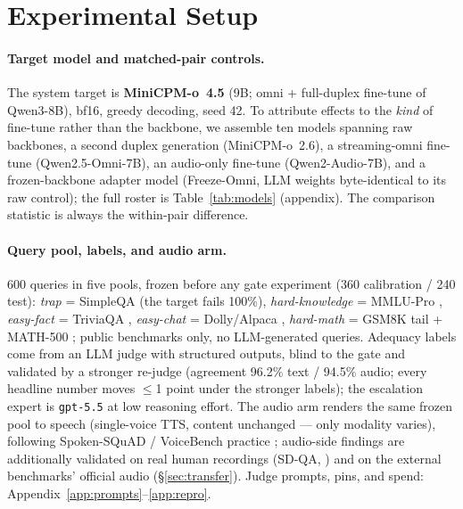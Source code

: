 \section{Experimental Setup}
\label{sec:setup}

\paragraph{Target model and matched-pair controls.}
The system target is \textbf{MiniCPM-o~4.5} (9B; omni + full-duplex
fine-tune of Qwen3-8B), bf16, greedy decoding, seed 42. To attribute
effects to the \emph{kind} of fine-tune rather than the backbone, we
assemble ten models spanning raw backbones, a second duplex generation
(MiniCPM-o~2.6), a streaming-omni fine-tune (Qwen2.5-Omni-7B), an
audio-only fine-tune (Qwen2-Audio-7B), and a frozen-backbone adapter
model (Freeze-Omni, LLM weights byte-identical to its raw control);
the full roster is Table~\ref{tab:models} (appendix). The comparison
statistic is always the within-pair difference.

\paragraph{Query pool, labels, and audio arm.}
600 queries in five pools, frozen before any gate experiment (360
calibration / 240 test): \emph{trap} = SimpleQA \citep{wei2024simpleqa}
(the target fails 100\%), \emph{hard-knowledge} = MMLU-Pro
\citep{wang2024mmlupro}, \emph{easy-fact} = TriviaQA
\citep{joshi2017triviaqa}, \emph{easy-chat} = Dolly/Alpaca
\citep{conover2023dolly,taori2023alpaca}, \emph{hard-math} = GSM8K tail
+ MATH-500 \citep{cobbe2021gsm8k,hendrycks2021math,lightman2024lets};
public benchmarks only, no LLM-generated queries. Adequacy labels come
from an LLM judge \citep{zheng2023judging} with structured outputs,
blind to the gate and validated by a stronger re-judge (agreement 96.2\%
text / 94.5\% audio; every headline number moves $\le$1 point under the
stronger labels); the escalation expert is \texttt{gpt-5.5} at low
reasoning effort. The audio arm renders the same frozen pool to speech
(single-voice TTS, content unchanged --- only modality varies),
following Spoken-SQuAD / VoiceBench practice
\citep{li2018spokensquad,chen2024voicebench}; audio-side findings are
additionally validated on real human recordings (SD-QA,
\citealp{faisal2021sdqa}) and on the external benchmarks' official
audio (\S\ref{sec:transfer}). Judge prompts, pins, and spend:
Appendix~\ref{app:prompts}--\ref{app:repro}.


